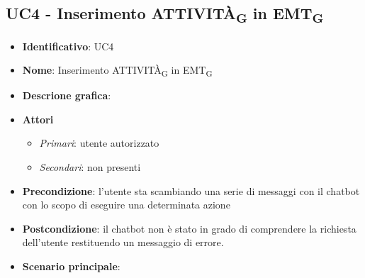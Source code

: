 \subsection{UC4 - Inserimento ATTIVITÀ\textsubscript{G} in EMT\textsubscript{G}}
\begin{itemize}
    \item \textbf{Identificativo}: UC4 
    \item \textbf{Nome}: Inserimento ATTIVITÀ\textsubscript{G} in EMT\textsubscript{G}
    \item \textbf{Descrione grafica}:
    \item \textbf{Attori}
 \begin{itemize} 
    \item \textit{Primari}: utente autorizzato
    \item \textit{Secondari}: non presenti
 \end{itemize}
 \item \textbf{Precondizione}: l'utente sta scambiando una serie di messaggi con il chatbot con lo scopo di eseguire una determinata azione
 \item \textbf{Postcondizione}: il chatbot non è stato in grado di comprendere la richiesta dell'utente restituendo un messaggio di errore.  
 \item \textbf{Scenario principale}: 
\end{itemize}